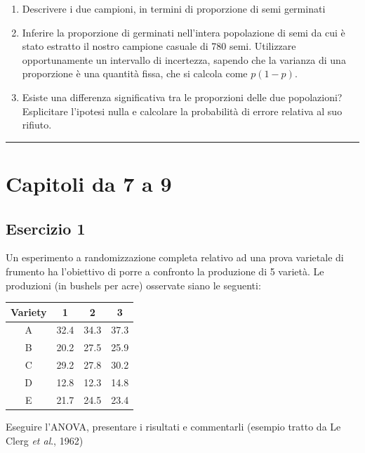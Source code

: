 \documentclass[a4paper,12pt,oneside]{book}
\providecommand{\tightlist}{%
  \setlength{\itemsep}{0pt}\setlength{\parskip}{0pt}}
\begin{document}
\begin{enumerate}
\def\labelenumi{\arabic{enumi}.}
\tightlist
\item
  Descrivere i due campioni, in termini di proporzione di semi germinati
\item
  Inferire la proporzione di germinati nell'intera popolazione di semi da cui è stato estratto il nostro campione casuale di 780 semi. Utilizzare opportunamente un intervallo di incertezza, sapendo che la varianza di una proporzione è una quantità fissa, che si calcola come \(p ( 1- p)\).
\item
  Esiste una differenza significativa tra le proporzioni delle due popolazioni? Esplicitare l'ipotesi nulla e calcolare la probabilità di errore relativa al suo rifiuto.
\end{enumerate}

\begin{center}\rule{0.5\linewidth}{0.5pt}\end{center}

\hypertarget{capitoli-da-7-a-9}{%
\section{Capitoli da 7 a 9}\label{capitoli-da-7-a-9}}

\hypertarget{esercizio-1-5}{%
\subsection{Esercizio 1}\label{esercizio-1-5}}

Un esperimento a randomizzazione completa relativo ad una prova varietale di frumento ha l'obiettivo di porre a confronto la produzione di 5 varietà. Le produzioni (in bushels per acre) osservate siano le seguenti:

\begin{longtable}[]{@{}cccc@{}}
\toprule
Variety & 1 & 2 & 3 \\
\midrule
\endhead
A & 32.4 & 34.3 & 37.3 \\
B & 20.2 & 27.5 & 25.9 \\
C & 29.2 & 27.8 & 30.2 \\
D & 12.8 & 12.3 & 14.8 \\
E & 21.7 & 24.5 & 23.4 \\
\bottomrule
\end{longtable}

Eseguire l'ANOVA, presentare i risultati e commentarli (esempio tratto da Le Clerg \emph{et al}., 1962)
\end{document}
